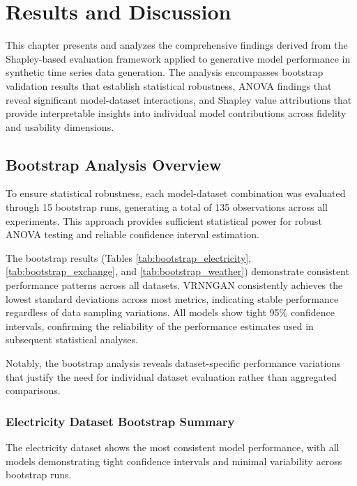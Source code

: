 \documentclass[11pt]{article}
\begin{document}
\newpage

\section{Results and Discussion}


This chapter presents and analyzes the comprehensive findings derived from the Shapley-based evaluation framework applied to generative model performance in synthetic time series data generation. The analysis encompasses bootstrap validation results that establish statistical robustness, ANOVA findings that reveal significant model-dataset interactions, and Shapley value attributions that provide interpretable insights into individual model contributions across fidelity and usability dimensions.

\subsection{Bootstrap Analysis Overview}
To ensure statistical robustness, each model-dataset combination was evaluated through 15 bootstrap runs, generating a total of 135 observations across all experiments. This approach provides sufficient statistical power for robust ANOVA testing and reliable confidence interval estimation.

The bootstrap results (Tables \ref{tab:bootstrap_electricity}, \ref{tab:bootstrap_exchange}, and \ref{tab:bootstrap_weather}) demonstrate consistent performance patterns across all datasets. VRNNGAN consistently achieves the lowest standard deviations across most metrics, indicating stable performance regardless of data sampling variations. All models show tight 95\% confidence intervals, confirming the reliability of the performance estimates used in subsequent statistical analyses.

Notably, the bootstrap analysis reveals dataset-specific performance variations that justify the need for individual dataset evaluation rather than aggregated comparisons.

\newpage 
\subsubsection{Electricity Dataset Bootstrap Summary}
The electricity dataset shows the most consistent model performance, with all models demonstrating tight confidence intervals and minimal variability across bootstrap runs.
\end{document}
